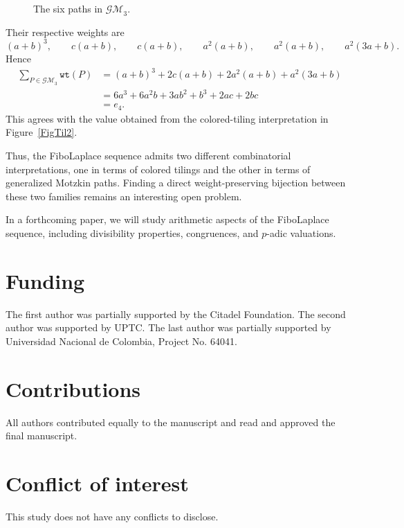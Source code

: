 \documentclass[11pt]{amsart}
\newcommand{\wt}{{\texttt{wt}}}
\theoremstyle{plain}
\numberwithin{equation}{section}
\begin{document}
\begin{figure}[ht!]
\caption{The six paths in $\mathcal{GM}_3$.}
\label{exMotzkin}
\end{figure}
Their respective weights are
\[
(a+b)^3,\qquad c(a+b),\qquad c(a+b),\qquad
a^2(a+b),\qquad a^2(a+b),\qquad a^2(3a+b).
\]
Hence
\[
\begin{aligned}
\sum_{P\in\mathcal{GM}_3}\wt(P)
&=(a+b)^3+2c(a+b)+2a^2(a+b)+a^2(3a+b)\\
&=6a^3+6a^2b+3ab^2+b^3+2ac+2bc\\
&=e_4.
\end{aligned}
\]
This agrees with the value obtained from the colored-tiling
interpretation in Figure~\ref{FigTil2}.

Thus, the FiboLaplace sequence admits two different combinatorial interpretations, one in terms of colored tilings and the other in terms of generalized Motzkin paths. Finding a direct weight-preserving bijection between these two families remains an interesting open problem.

In a forthcoming paper, we will study arithmetic aspects of the FiboLaplace sequence, including divisibility properties, congruences, and $p$-adic
valuations.

\section*{Funding}
The first author was partially supported
by the Citadel Foundation. The second author was supported by UPTC. The
last author was partially supported by Universidad Nacional de Colombia, Project No. 64041. 
\vspace{-0.3cm}
\section*{Contributions}
All authors contributed equally to the manuscript and read and approved the final manuscript.
\vspace{-0.3cm}

\section*{Conflict of interest}
This study does not have any conflicts to disclose. 
\vspace{-0.3cm}
\end{document}
